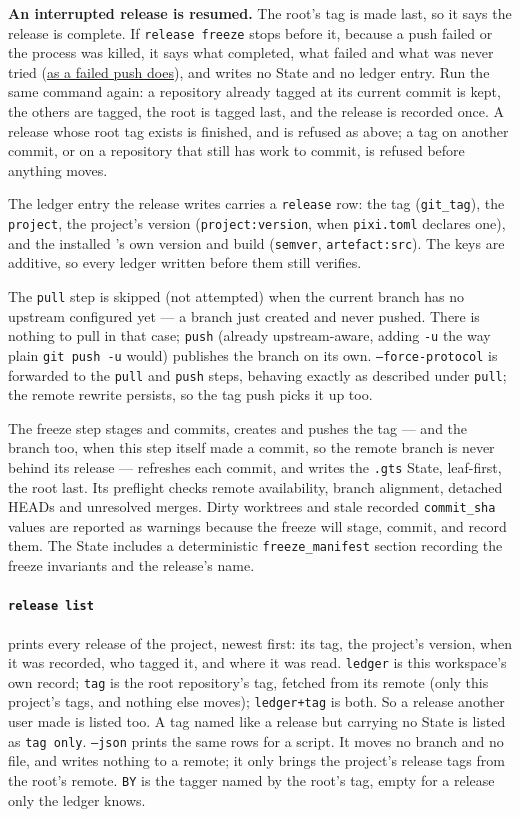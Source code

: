 \textbf{An interrupted release is resumed.} The root's tag is made last, so
it says the release is complete. If \texttt{release freeze} stops before it,
because a push failed or the process was killed, it says what completed, what
failed and what was never tried (\hyperref[sec:partial-failure]{as a failed
push does}), and writes no State and no ledger entry. Run the same command
again: a repository already tagged at its current commit is kept, the others
are tagged, the root is tagged last, and the release is recorded once. A
release whose root tag exists is finished, and is refused as above; a tag on
another commit, or on a repository that still has work to commit, is refused
before anything moves.

The ledger entry the release writes carries a \texttt{release} row: the
tag (\texttt{git\_tag}), the \texttt{project}, the project's version
(\texttt{project:version}, when \texttt{pixi.toml} declares one), and the
installed \cgscli{}'s own version and build (\texttt{semver},
\texttt{artefact:src}). The keys are additive, so every ledger written
before them still verifies.

The \texttt{pull} step is skipped (not attempted) when the current branch
has no upstream configured yet --- a branch just created and never pushed.
There is nothing to pull in that case; \texttt{push} (already
upstream-aware, adding \texttt{-u} the way plain \texttt{git push -u} would)
publishes the branch on its own. \texttt{--force-protocol} is forwarded to
the \texttt{pull} and \texttt{push} steps, behaving exactly as described
under \texttt{pull}; the remote rewrite persists, so the tag push picks it
up too.

The freeze step stages and commits, creates and pushes the tag --- and the
branch too, when this step itself made a commit, so the remote branch is
never behind its release --- refreshes each commit, and writes the
\texttt{.gts} State, leaf-first, the root last. Its preflight checks remote
availability, branch alignment, detached HEADs and unresolved merges. Dirty
worktrees and stale recorded \texttt{commit\_sha} values are reported as
warnings because the freeze will stage, commit, and record them. The State
includes a deterministic \texttt{freeze\_manifest} section recording the
freeze invariants and the release's name.

\paragraph{\texttt{release list}} prints every release of the project,
newest first: its tag, the project's version, when it was recorded, who
tagged it, and where it was read. \texttt{ledger} is this workspace's own
record; \texttt{tag} is the root repository's tag, fetched from its remote
(only this project's tags, and nothing else moves);
\texttt{ledger+tag} is both. So a release another user made is listed too.
A tag named like a release but carrying no State is listed as \texttt{tag
only}. \texttt{--json} prints the same rows for a script. It moves no
branch and no file, and writes nothing to a remote; it only brings the
project's release tags from the root's remote. \texttt{BY} is the tagger
named by the root's tag, empty for a release only the ledger knows.

